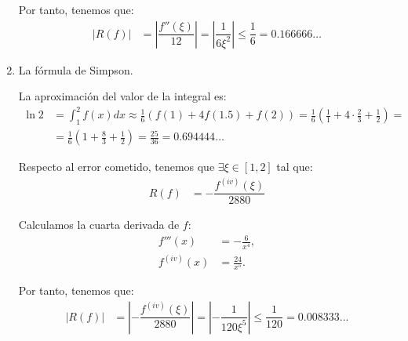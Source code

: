 \begin{ejercicio}
\begin{enumerate}
        Por tanto, tenemos que:
        \begin{align*}
            |R(f)| &= \left|\dfrac{f''(\xi)}{12} \right| = \left|\dfrac{1}{6\xi^2} \right| \leq \dfrac{1}{6} = 0.166666\ldots
        \end{align*}
        \item La fórmula de Simpson.
        
        La aproximación del valor de la integral es:
        \begin{align*}
            \ln 2 &= \int_{1}^{2} f(x) dx \approx \frac{1}{6} (f(1) + 4f(1.5) + f(2)) = \frac{1}{6} \left(\frac{1}{1} + 4\cdot \frac{2}{3} + \frac{1}{2}\right) =\\&= \frac{1}{6} \left(1 + \frac{8}{3} + \frac{1}{2}\right) = \frac{25}{36} = 0.694444\ldots
        \end{align*}

        Respecto al error cometido, tenemos que $\exists \xi \in [1, 2]$ tal que:
        \begin{align*}
            R(f) &= -\dfrac{f^{(iv)}(\xi)}{2880}
        \end{align*}

        Calculamos la cuarta derivada de $f$:
        \begin{align*}
            f'''(x) &= -\frac{6}{x^4},\\
            f^{(iv)}(x) &= \frac{24}{x^5}.
        \end{align*}

        Por tanto, tenemos que:
        \begin{align*}
            |R(f)| &= \left| -\dfrac{f^{(iv)}(\xi)}{2880} \right| = \left| -\dfrac{1}{120\xi^5} \right| \leq \dfrac{1}{120} = 0.008333\ldots
        \end{align*}

    \end{enumerate}
\end{ejercicio}

